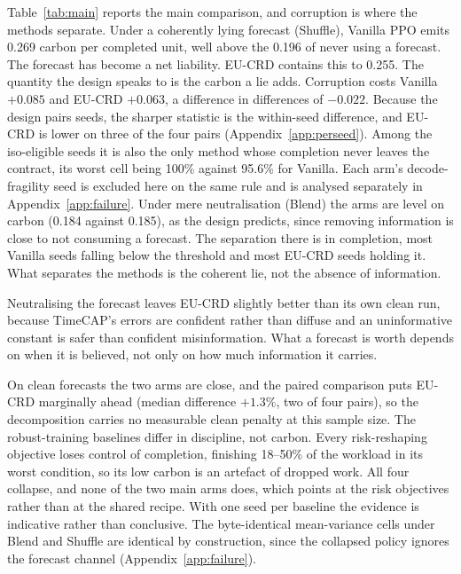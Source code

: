 \documentclass{article} %
\newcommand{\ResContainVan}{0.085}     %
\newcommand{\ResContainEu}{0.063}      %
\newcommand{\ResContainDiD}{-0.022}    %
\newcommand{\ResNoFcst}{0.196}         %
\newcommand{\ResVanShuffle}{0.269}    %
\newcommand{\ResEuShuffle}{0.255}      %
\begin{document}
Table~\ref{tab:main} reports the main comparison, and corruption is where the methods separate. Under a coherently lying forecast (Shuffle), Vanilla PPO emits \ResVanShuffle{} carbon per completed unit, well above the \ResNoFcst{} of never using a forecast. The forecast has become a net liability. EU-CRD contains this to \ResEuShuffle{}. The quantity the design speaks to is the carbon a lie adds. Corruption costs Vanilla $+\ResContainVan$ and EU-CRD $+\ResContainEu$, a difference in differences of $\ResContainDiD$. Because the design pairs seeds, the sharper statistic is the within-seed difference, and EU-CRD is lower on three of the four pairs (Appendix~\ref{app:perseed}). Among the iso-eligible seeds it is also the only method whose completion never leaves the contract, its worst cell being 100\% against 95.6\% for Vanilla. Each arm's decode-fragility seed is excluded here on the same rule and is analysed separately in Appendix~\ref{app:failure}. Under mere neutralisation (Blend) the arms are level on carbon (0.184 against 0.185), as the design predicts, since removing information is close to not consuming a forecast. The separation there is in completion, most Vanilla seeds falling below the threshold and most EU-CRD seeds holding it. What separates the methods is the coherent lie, not the absence of information.

Neutralising the forecast leaves EU-CRD slightly better than its own clean run, because TimeCAP's errors are confident rather than diffuse and an uninformative constant is safer than confident misinformation. What a forecast is worth depends on when it is believed, not only on how much information it carries.

On clean forecasts the two arms are close, and the paired comparison puts EU-CRD marginally ahead (median difference $+1.3\%$, two of four pairs), so the decomposition carries no measurable clean penalty at this sample size. The robust-training baselines differ in discipline, not carbon. Every risk-reshaping objective loses control of completion, finishing 18--50\% of the workload in its worst condition, so its low carbon is an artefact of dropped work. All four collapse, and none of the two main arms does, which points at the risk objectives rather than at the shared recipe. With one seed per baseline the evidence is indicative rather than conclusive. The byte-identical mean-variance cells under Blend and Shuffle are identical by construction, since the collapsed policy ignores the forecast channel (Appendix~\ref{app:failure}).
\end{document}
